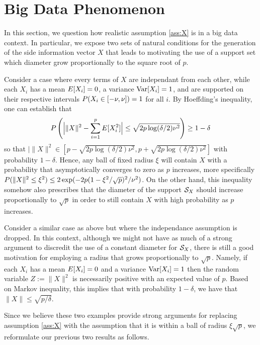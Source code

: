 \section{Big Data Phenomenon}\label{sec:bigdata}

In this section, we question how realistic assumption \ref{ass:X} is in a big data
context. In particular, we expose two sets of natural conditions for the generation of the
side information vector $X$ that leads to motivating the use of a support set which
diameter grow proportionally to the square root of $p$.

\begin{ex}
  Consider a case where every terms of $X$ are independant from each other, while each
  $X_i$ has a mean $E[X_i]=0$, a variance $\operatorname{Var}[X_i]=1$, and are supported on their
  respective intervals $P(X_i\in [-\nu, \nu])=1$ for all $i$. By Hoeffding's
  inequality, one can establish that
  \[
    P\left(\Bigl|\|X\|^2 - \sum_{i=1}^p E[X_i^2]\Bigr| \leq
      \sqrt{2p\log(\delta/2)\nu^2}\right) \geq 1-\delta
  \]
  so that
  $|\|X\|^2 \in [p- \sqrt{2p\log(\delta/2)\nu^2}, p+ \sqrt{2p\log(\delta/2)\nu^2}]$ with
  probability $1-\delta$. Hence, any ball of fixed radius $\xi$ will contain $X$ with a
  probability that asymptotically converges to zero as $p$ increases, more specifically
  $P(\|X\|^2\leq \xi^2)\leq 2\exp(-2p(1-\xi^2/\sqrt{p})^2/\nu^2)$. On the other hand,
  this inequality somehow also prescribes that the diameter of the support ${\mathcal{S}_X}$ should
  increase proportionally to $\sqrt{p}$ in order to still contain $X$ with high
  probability as $p$ increases.
\end{ex}

\begin{ex}
  Consider a similar case as above but where the independance assumption is dropped. In
  this context, although we might not have as much of a strong argument to discredit the
  use of a constant diameter for ${\mathcal{S}_X}$, there is still a good motivation for employing a
  radius that grows proportionally to $\sqrt{p}$. Namely, if each $X_i$ has a mean
  $E[X_i]=0$ and a variance $\operatorname{Var}[X_i]=1$ then the random variable $Z:=\|X\|^2$ is
  necessarily positive with an expected value of $p$. Based on Markov inequality, this
  implies that with probability $1-\delta$, we have that $\|X\|\leq \sqrt{p/\delta}$.
\end{ex}

Since we believe these two examples provide strong arguments for replacing assumption
\ref{ass:X} with the assumption that it is within a ball of radius $\xi\sqrt{p}$, we
reformulate our previous two results as follows.

